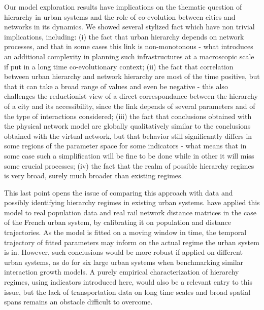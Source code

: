 \documentclass[11pt]{article}
\begin{document}
Our model exploration results have implications on the thematic question of hierarchy in urban systems and the role of co-evolution between cities and networks in its dynamics. We showed several stylized fact which have non trivial implications, including: (i) the fact that urban hierarchy depends on network processes, and that in some cases this link is non-monotonous - what introduces an additional complexity in planning such infrastructures at a macroscopic scale if put in a long time co-evolutionary context; (ii) the fact that correlation between urban hierarchy and network hierarchy are most of the time positive, but that it can take a broad range of values and even be negative - this also challenges the reductionist view of a direct correspondance between the hierarchy of a city and its accessibility, since the link depends of several parameters and of the type of interactions considered; (iii) the fact that conclusions obtained with the physical network model are globally qualitatively similar to the conclusions obtained with the virtual network, but that behavior still significantly differs in some regions of the parameter space for some indicators - what means that in some case such a simplification will be fine to be done while in other it will miss some crucial processes; (iv) the fact that the realm of possible hierarchy regimes is very broad, surely much broader than existing regimes.

This last point opens the issue of comparing this approach with data and possibly identifying hierarchy regimes in existing urban systems. \cite{raimbault2018modeling} have applied this model to real population data and real rail network distance matrices in the case of the French urban system, by calibrating it on population and distance trajectories. As the model is fitted on a moving window in time, the temporal trajectory of fitted parameters may inform on the actual regime the urban system is in. However, such conclusions would be more robust if applied on different urban systems, as \cite{raimbault2019evolutionary} do for six large urban systems when benchmarking similar interaction growth models. A purely empirical characterization of hierarchy regimes, using indicators introduced here, would also be a relevant entry to this issue, but the lack of transportation data on long time scales and broad spatial spans remains an obstacle difficult to overcome. 


\end{document}
